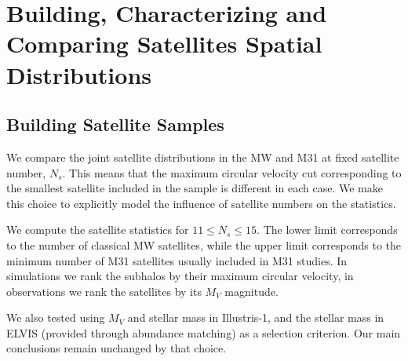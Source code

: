 \documentclass[a4paper,fleqn,usenatbib]{mnras}
\begin{document}
\section{Building, Characterizing and Comparing Satellites Spatial Distributions}
\label{sec:SpatialMeasurements}


\subsection{Building Satellite Samples}

We compare the joint satellite distributions in the MW and M31 at fixed
satellite number, $N_s$.
This means that the maximum circular velocity cut corresponding to the
smallest satellite included in the sample is different in each case.
We make this choice to explicitly model the influence of satellite numbers
on the statistics. 

We compute the satellite statistics for $11\leq N_s\leq 15$.
The lower limit corresponds to the number of classical MW satellites,
while the upper limit corresponds to the minimum number of M31
satellites usually included in M31 studies.
In simulations we rank the subhalos by their maximum circular
velocity, in observations we rank the satellites by its $M_V$
magnitude.  

We also tested using $M_V$ and stellar mass in Illustris-1, and the
stellar mass in ELVIS (provided through abundance matching) as a
selection criterion. Our main conclusions remain unchanged by that
choice. 
\end{document}

